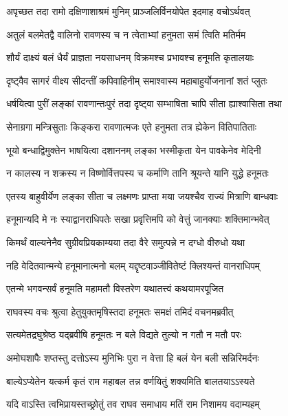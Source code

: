 
\twolineshloka
{अपृच्छत तदा रामो दक्षिणाशाश्रमं मुनिम्}
{प्राञ्जलिर्विनयोपेत इदमाह वचोऽर्थवत्} %

\twolineshloka
{अतुलं बलमेतद्वै वालिनो रावणस्य च}
{न त्वेताभ्यां हनुमता समं त्विति मतिर्मम} %

\twolineshloka
{शौर्यं दाक्ष्यं बलं धैर्यं प्राज्ञता नयसाधनम्}
{विक्रमश्च प्रभावश्च हनूमति कृतालयाः} %

\twolineshloka
{दृष्ट्वैव सागरं वीक्ष्य सीदन्तीं कपिवाहिनीम्}
{समाश्वास्य महाबाहुर्योजनानां शतं प्लुतः} %

\twolineshloka
{धर्षयित्वा पुरीं लङ्कां रावणान्तःपुरं तदा}
{दृष्ट्वा सम्भाषिता चापि सीता ह्याश्वासिता तथा} %

\twolineshloka
{सेनाग्रगा मन्त्रिसुताः किङ्करा रावणात्मजः}
{एते हनुमता तत्र ह्येकेन वितिपातिताः} %

\twolineshloka
{भूयो बन्धाद्विमुक्तेन भाषयित्वा दशाननम्}
{लङ्का भस्मीकृता येन पावकेनेव मेदिनी} %

\twolineshloka
{न कालस्य न शक्रस्य न विष्णोर्वित्तपस्य च}
{कर्माणि तानि श्रूयन्ते यानि युद्धे हनूमतः} %

\twolineshloka
{एतस्य बाहुवीर्येण लङ्का सीता च लक्ष्मणः}
{प्राप्ता मया जयश्चैव राज्यं मित्राणि बान्धवाः} %

\twolineshloka
{हनूमान्यदि मे नः स्याद्वानराधिपतेः सखा}
{प्रवृत्तिमपि को वेत्तुं जानक्याः शक्तिमान्भवेत्} %

\twolineshloka
{किमर्थं वाल्यनेनैव सुग्रीवप्रियकाम्यया}
{तदा वैरे समुत्पन्ने न दग्धो वीरुधो यथा} %

\twolineshloka
{नहि वेदितवान्मन्ये हनूमानात्मनो बलम्}
{यद्दृष्टवाञ्जीवितेष्टं क्लिश्यन्तं वानराधिपम्} %

\twolineshloka
{एतन्मे भगवन्सर्वं हनूमति महामतौ}
{विस्तरेण यथातत्त्वं कथयामरपूजित} %

\twolineshloka
{राघवस्य वचः श्रुत्वा हेतुयुक्तमृषिस्तदा}
{हनूमतः समक्षं तमिदं वचनमब्रवीत्} %

\twolineshloka
{सत्यमेतद्रघुश्रेष्ठ यद्ब्रवीषि हनूमतः}
{न बले विद्यते तुल्यो न गतौ न मतौ परः} %

\twolineshloka
{अमोघशापैः शप्तस्तु दत्तोऽस्य मुनिभिः पुरा}
{न वेत्ता हि बलं येन बली सन्निरिमर्दनः} %

\twolineshloka
{बाल्येऽप्येतेन यत्कर्म कृतं राम महाबल}
{तन्न वर्णयितुं शक्यमिति बालतयाऽऽस्यते} %

\twolineshloka
{यदि वाऽस्ति त्वभिप्रायस्तच्छ्रोतुं तव राघव}
{समाधाय मतिं राम निशामय वदाम्यहम्} %

